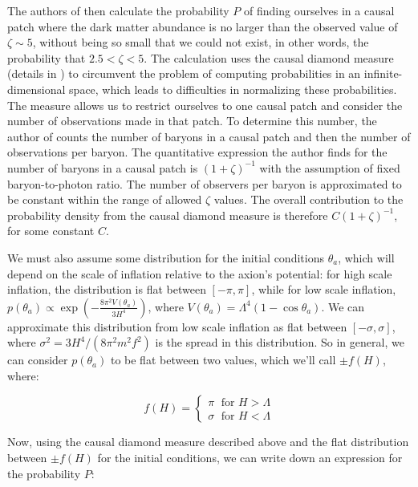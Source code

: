 \documentclass[11pt]{article}
\begin{document}
The authors of \cite{exploring-string-axiverse} then calculate the probability $P$ of finding ourselves in a causal patch where the dark matter abundance is no larger than the observed value of $\zeta \sim 5$, without being so small that we could not exist, in other words, the probability that $2.5<\zeta<5$. The calculation uses the causal diamond measure (details in \cite{anthropic-explanation}) to circumvent the problem of computing probabilities in an infinite-dimensional space, which leads to difficulties in normalizing these probabilities. The measure allows us to restrict ourselves to one causal patch and consider the number of observations made in that patch. To determine this number, the author of \cite{anthropic-explanation} counts the number of baryons in a causal patch and then the number of observations per baryon. The quantitative expression the author finds for the number of baryons in a causal patch is $(1+\zeta)^{-1}$ with the assumption of fixed baryon-to-photon ratio. The number of observers per baryon is approximated to be constant within the range of allowed $\zeta$ values. The overall contribution to the probability density from the causal diamond measure is therefore $C(1+\zeta)^{-1}$, for some constant $C$.

We must also assume some distribution for the initial conditions $\theta_a$, which will depend on the scale of inflation relative to the axion's potential: for high scale inflation, the distribution is flat between $[-\pi,\pi]$, while for low scale inflation,     $p(\theta_a) \propto \exp{\left(-\frac{8\pi^2V(\theta_a)}{3H^4}\right)}$, where $V(\theta_a)=\Lambda^4(1-\cos{\theta_a})$. We can approximate this distribution from low scale inflation as flat between $[-\sigma,\sigma]$, where $\sigma^2 = 3H^4/(8\pi^2m^2f^2)$ is the spread in this distribution. So in general, we can consider $p(\theta_a)$ to be flat between two values, which we'll call $\pm f(H)$, where:

\begin{equation}
\label{eq:f(H)}
    f(H) = \begin{cases}
        \pi \; \text{ for } H>\Lambda\\
        \sigma \; \text{ for } H < \Lambda
    \end{cases}
\end{equation}

Now, using the causal diamond measure described above and the flat distribution between $\pm f(H)$ for the initial conditions, we can write down an expression for the probability $P$:
\end{document}
